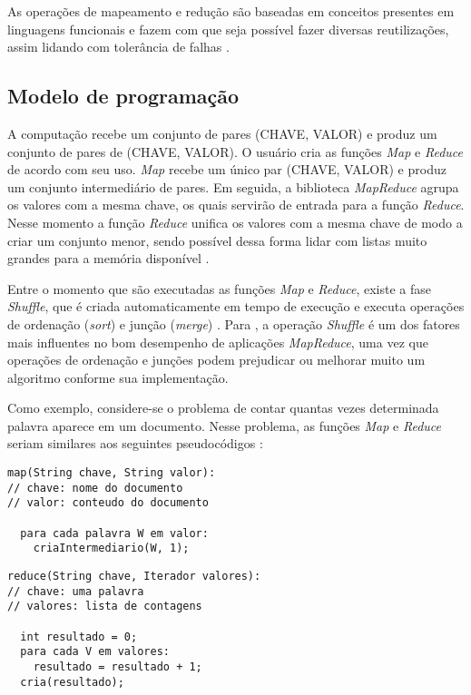As operações de mapeamento e redução são baseadas em conceitos presentes em linguagens funcionais e fazem com que seja possível fazer diversas reutilizações, assim lidando com tolerância de falhas \cite{MapReduce08}.

\subsection{Modelo de programação}\label{ssec:mapreducemodelo}

A computação recebe um conjunto de pares (CHAVE, VALOR) e produz um conjunto de pares de (CHAVE, VALOR). O usuário cria as funções \textit{Map} e \textit{Reduce} de acordo com seu uso. \textit{Map} recebe um único par (CHAVE, VALOR) e produz um conjunto intermediário de pares. Em seguida, a biblioteca \textit{MapReduce} agrupa os valores com a mesma chave, os quais servirão de entrada para a função \textit{Reduce}. Nesse momento a função \textit{Reduce} unifica os valores com a mesma chave de modo a criar um conjunto menor, sendo possível dessa forma lidar com listas muito grandes para a memória disponível \cite{MapReduce08}. 

Entre o momento que são executadas as funções \textit{Map} e \textit{Reduce}, existe a fase \textit{Shuffle}, que é criada automaticamente em tempo de execução e executa operações de ordenação (\textit{sort}) e junção (\textit{merge}) \cite{ProHadoop09}. Para \textcite{HadoopBook15}, a operação \textit{Shuffle} é um dos fatores mais influentes no bom desempenho de aplicações \textit{MapReduce}, uma vez que operações de ordenação e junções podem prejudicar ou melhorar muito um algoritmo conforme sua implementação.

Como exemplo, considere-se o problema de contar quantas vezes determinada palavra aparece em um documento. Nesse problema, as funções \textit{Map} e \textit{Reduce} seriam similares aos seguintes pseudocódigos \cite{MapReduce08}:

\begin{lstlisting}[caption={Exemplo de função Map em pseudocódigo adaptado de \cite{MapReduce08}}, label=code:codigo1]
map(String chave, String valor):
// chave: nome do documento
// valor: conteudo do documento

  para cada palavra W em valor:
    criaIntermediario(W, 1);
\end{lstlisting}

\begin{lstlisting}[caption={Exemplo de função Reduce em pseudocódigo adaptado de \cite{MapReduce08}}, label=code:codigo2]
reduce(String chave, Iterador valores):
// chave: uma palavra
// valores: lista de contagens

  int resultado = 0;
  para cada V em valores:
    resultado = resultado + 1;
  cria(resultado);
\end{lstlisting}

